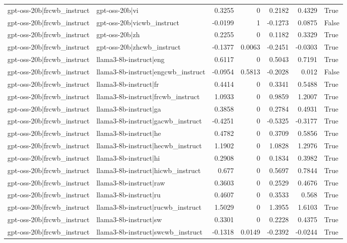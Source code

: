 \begin{table}
\begin{tabular}{l l r r r r l}
gpt-oss-20b|frcwb_instruct & gpt-oss-20b|vi & 0.3255 & 0 & 0.2182 & 0.4329 & True \\
gpt-oss-20b|frcwb_instruct & gpt-oss-20b|vicwb_instruct & -0.0199 & 1 & -0.1273 & 0.0875 & False \\
gpt-oss-20b|frcwb_instruct & gpt-oss-20b|zh & 0.2255 & 0 & 0.1182 & 0.3329 & True \\
gpt-oss-20b|frcwb_instruct & gpt-oss-20b|zhcwb_instruct & -0.1377 & 0.0063 & -0.2451 & -0.0303 & True \\
gpt-oss-20b|frcwb_instruct & llama3-8b-instruct|eng & 0.6117 & 0 & 0.5043 & 0.7191 & True \\
gpt-oss-20b|frcwb_instruct & llama3-8b-instruct|engcwb_instruct & -0.0954 & 0.5813 & -0.2028 & 0.012 & False \\
gpt-oss-20b|frcwb_instruct & llama3-8b-instruct|fr & 0.4414 & 0 & 0.3341 & 0.5488 & True \\
gpt-oss-20b|frcwb_instruct & llama3-8b-instruct|frcwb_instruct & 1.0933 & 0 & 0.9859 & 1.2007 & True \\
gpt-oss-20b|frcwb_instruct & llama3-8b-instruct|ga & 0.3858 & 0 & 0.2784 & 0.4931 & True \\
gpt-oss-20b|frcwb_instruct & llama3-8b-instruct|gacwb_instruct & -0.4251 & 0 & -0.5325 & -0.3177 & True \\
gpt-oss-20b|frcwb_instruct & llama3-8b-instruct|he & 0.4782 & 0 & 0.3709 & 0.5856 & True \\
gpt-oss-20b|frcwb_instruct & llama3-8b-instruct|hecwb_instruct & 1.1902 & 0 & 1.0828 & 1.2976 & True \\
gpt-oss-20b|frcwb_instruct & llama3-8b-instruct|hi & 0.2908 & 0 & 0.1834 & 0.3982 & True \\
gpt-oss-20b|frcwb_instruct & llama3-8b-instruct|hicwb_instruct & 0.677 & 0 & 0.5697 & 0.7844 & True \\
gpt-oss-20b|frcwb_instruct & llama3-8b-instruct|raw & 0.3603 & 0 & 0.2529 & 0.4676 & True \\
gpt-oss-20b|frcwb_instruct & llama3-8b-instruct|ru & 0.4607 & 0 & 0.3533 & 0.568 & True \\
gpt-oss-20b|frcwb_instruct & llama3-8b-instruct|rucwb_instruct & 1.5029 & 0 & 1.3955 & 1.6103 & True \\
gpt-oss-20b|frcwb_instruct & llama3-8b-instruct|sw & 0.3301 & 0 & 0.2228 & 0.4375 & True \\
gpt-oss-20b|frcwb_instruct & llama3-8b-instruct|swcwb_instruct & -0.1318 & 0.0149 & -0.2392 & -0.0244 & True \\

\end{tabular}
\end{table}
